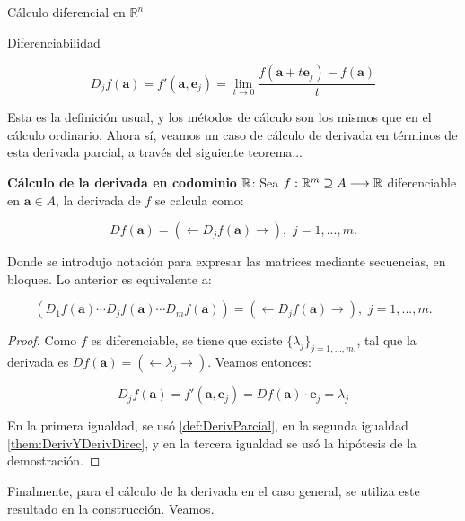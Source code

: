 \begin{chapter}{Cálculo diferencial en $\mathbb{R}^n$}
\begin{section}{Diferenciabilidad}
\begin{defn}
\begin{equation*}
    D_jf(\textbf{a}) = f'(\textbf{a},\textbf{e}_j) = \lim_{t\rightarrow0}\frac{f(\textbf{a}+t\textbf{e}_j) - f(\textbf{a})}{t}
\end{equation*}
\end{defn}

Esta es la definición usual, y los métodos de cálculo son los mismos que en el cálculo ordinario. Ahora sí, veamos un caso de cálculo de derivada en términos de esta derivada parcial, a través del siguiente teorema...

\begin{them}
\label{them:CalcDerR}
\textbf{Cálculo de la derivada en codominio $\mathbb{R}$}: Sea $f: \mathbb{R}^m \supseteq A \longrightarrow \mathbb{R}$ diferenciable en $\textbf{a} \in A$, la derivada de $f$ se calcula como:

\begin{equation}
    Df(\textbf{a}) = \left( \leftarrow D_jf(\textbf{a}) \rightarrow \right)\text{, }\, j=1,...,m.
\end{equation}

Donde se introdujo notación para expresar las matrices mediante secuencias, en bloques. Lo anterior es equivalente a:

\begin{equation*}
    \left( D_1f(\textbf{a}) \cdots D_jf(\textbf{a}) \cdots D_mf(\textbf{a}) \right) = \left( \leftarrow D_jf(\textbf{a}) \rightarrow \right)\text{, }\, j=1,...,m.
\end{equation*}
\end{them}

\begin{proof}
Como $f$ es diferenciable, se tiene que existe $\{\lambda_j\}_{j=1,...,m.}$, tal que la derivada es $Df(\textbf{a})=(\leftarrow \lambda_j \rightarrow)$. Veamos entonces:

\begin{equation*}
    D_jf(\textbf{a}) = f'(\textbf{a},\textbf{e}_j) = Df(\textbf{a})\cdot \textbf{e}_j = \lambda_j
\end{equation*}

En la primera igualdad, se usó \cref{def:DerivParcial}, en la segunda igualdad \cref{them:DerivYDerivDirec}, y en la tercera igualdad se usó la hipótesis de la demostración.

\end{proof}

Finalmente, para el cálculo de la derivada en el caso general, se utiliza este resultado en la construcción. Veamos.


\end{section}
\end{chapter}
